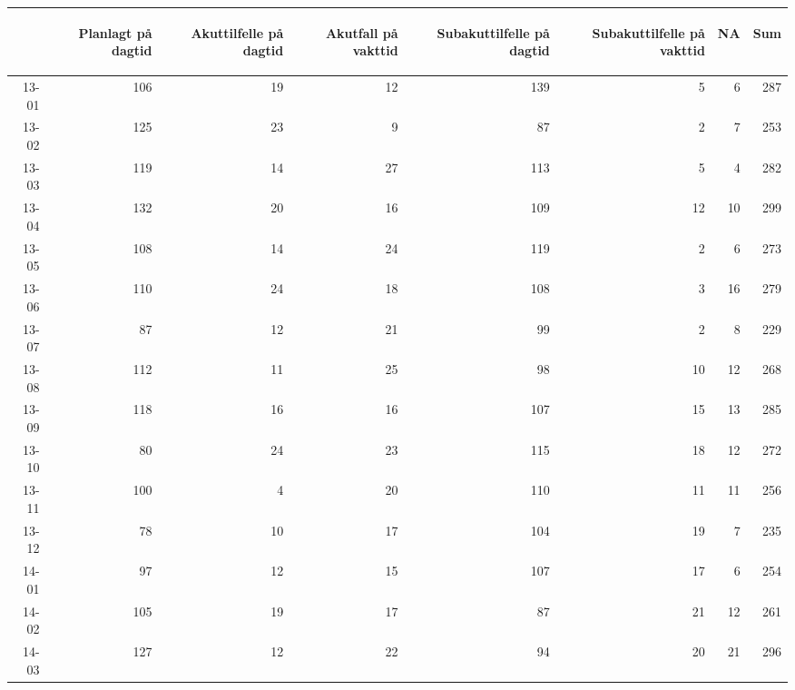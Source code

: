 \documentclass[presentation,xcolor=pdftex,dvipsnames,table]{beamer}
\begin{document}
\begin{frame}
\begin{tiny}
\begin{table}[ht]
\centering
\begin{tabular}{rrrrrrrr}
  \toprule
 & \begin{sideways} Planlagt på dagtid \end{sideways} & \begin{sideways} Akuttilfelle på dagtid \end{sideways} & \begin{sideways} Akutfall på vakttid \end{sideways} & \begin{sideways} Subakuttilfelle på dagtid \end{sideways} & \begin{sideways} Subakuttilfelle på vakttid \end{sideways} & \begin{sideways} NA \end{sideways} & \begin{sideways} Sum \end{sideways} \\ 
  \midrule
13-01 & 106 & 19 & 12 & 139 & 5 & 6 & 287 \\ 
  13-02 & 125 & 23 & 9 & 87 & 2 & 7 & 253 \\ 
  13-03 & 119 & 14 & 27 & 113 & 5 & 4 & 282 \\ 
  13-04 & 132 & 20 & 16 & 109 & 12 & 10 & 299 \\ 
  13-05 & 108 & 14 & 24 & 119 & 2 & 6 & 273 \\ 
  13-06 & 110 & 24 & 18 & 108 & 3 & 16 & 279 \\ 
  13-07 & 87 & 12 & 21 & 99 & 2 & 8 & 229 \\ 
  13-08 & 112 & 11 & 25 & 98 & 10 & 12 & 268 \\ 
  13-09 & 118 & 16 & 16 & 107 & 15 & 13 & 285 \\ 
  13-10 & 80 & 24 & 23 & 115 & 18 & 12 & 272 \\ 
  13-11 & 100 & 4 & 20 & 110 & 11 & 11 & 256 \\ 
  13-12 & 78 & 10 & 17 & 104 & 19 & 7 & 235 \\ 
  14-01 & 97 & 12 & 15 & 107 & 17 & 6 & 254 \\ 
  14-02 & 105 & 19 & 17 & 87 & 21 & 12 & 261 \\ 
  14-03 & 127 & 12 & 22 & 94 & 20 & 21 & 296 \\ 

\end{tabular}
\end{table}
\end{tiny}
\end{frame}
\end{document}
